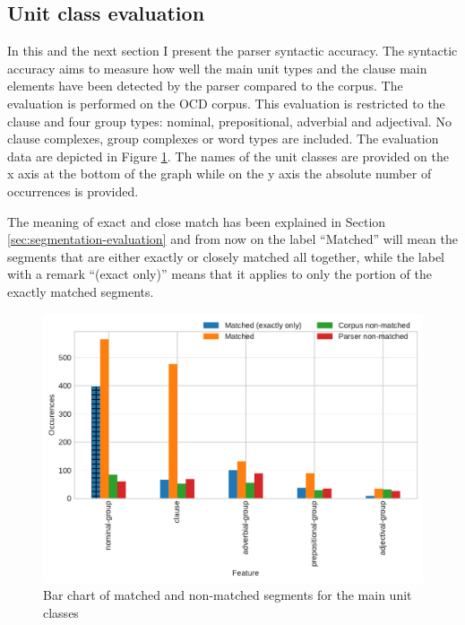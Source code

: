 \subsection{Unit class evaluation}
\label{sec:unit-class-evaluation}
    In this and the next section I present the parser syntactic accuracy. The syntactic accuracy aims to measure how well the main unit types and the clause main elements have been detected by the parser compared to the corpus. The evaluation is performed on the OCD corpus. This evaluation is restricted to the clause and four group types: nominal, prepositional, adverbial and adjectival. No clause complexes, group complexes or word types are included. The evaluation data are depicted in Figure \ref{fig:unit-types-data}. The names of the unit classes are provided on the x axis at the bottom of the graph while on the y axis the absolute number of occurrences is provided. 
    
    The meaning of exact and close match has been explained in Section \ref{sec:segmentation-evaluation} and from now on the label ``Matched'' will mean the segments that are either exactly or closely matched all together, while the label with a remark ``(exact only)'' means that it applies to only the portion of the exactly matched segments. 
    
    
    \begin{figure}[!ht]
    \centering
    \includegraphics[width=.85\textwidth]{evaluation-results/figures/unit-types-data.pdf}
    \caption{Bar chart of matched and non-matched segments for the main unit classes}
    \label{fig:unit-types-data}
    \end{figure}
    
